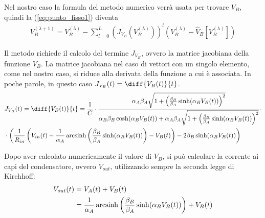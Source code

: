 	Nel nostro caso la formula del metodo numerico verrà usata per trovare $V_{B}$, quindi la (\ref{eq:punto_fisso1}) diventa
	\begin{equation}
		\label{eq:punto_fisso2}
		\begin{split}
			V_{B}^{(\lambda+1)} = V_{B}^{(\lambda)}-\sum_{l=0}^{L} \left(J_{V_{B}}(V_{B}^{(\lambda)})\right)^{l}(V_{B}^{(\lambda)}-\widehat V_{B}[V_{B}^{(\lambda)}])
		\end{split}
	\end{equation}
	
	Il metodo richiede il calcolo del termine $J_{V_{B}}$, ovvero la matrice jacobiana della funzione $V_{B}$. La matrice jacobiana nel caso di vettori con un singolo elemento, come nel nostro caso, si riduce alla derivata della funzione a cui è associata. In poche parole, in questo caso $J_{V_{B}}(t) = \diff{V_{B}(t)}{t}$.
	\begin{equation}
		\label{eq:jacobiana}
		\begin{split}
			&J_{V_{B}}(t) = \diff{V_{B}(t)}{t} = \frac{1}{C}\cdot\frac{\alpha_{A}\beta_{A}\sqrt{1+\left(\frac{\beta_{B}}{\beta_{A}}\sinh(\alpha_{B}V_{B}(t))\right)^{2}}}{\alpha_{B}\beta_{B}\cosh(\alpha_{B}V_{B}(t))+\alpha_{A}\beta_{A}\sqrt{1+\left(\frac{\beta_{B}}{\beta_{A}}\sinh(\alpha_{B}V_{B}(t))\right)^{2}}}\cdot\\&\cdot\left(\frac{1}{R_{in}}\left(V_{in}(t)-\frac{1}{\alpha_{A}} \arcsinh \left(\frac{\beta_{B}}{\beta_{A}} \sinh(\alpha_{B}V_{B}(t))\right)-V_{B}(t)\right)-2\beta_{B}\sinh(\alpha_{B}V_{B}(t))\right)\hspace{-7px}
		\end{split}
	\end{equation}
	
	Dopo aver calcolato numericamente il valore di $V_{B}$, si può calcolare la corrente ai capi del condensatore, ovvero $V_{out}$, utilizzando sempre la seconda legge di Kirchhoff:
	\begin{equation}
		\label{eq:tensione_finale}
		\begin{split}
			V_{out}(t) &= V_{A}(t)+V_{B}(t)\\
			&= \frac{1}{\alpha_{A}} \operatorname{arcsinh} \left(\frac{\beta_{B}}{\beta_{A}} \sinh(\alpha_{B}V_{B}(t))\right)+V_{B}(t)
		\end{split}
	\end{equation}
	

